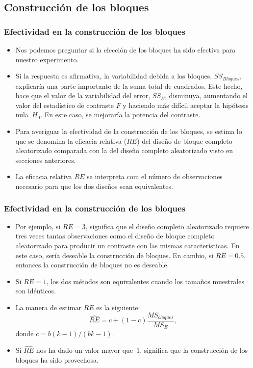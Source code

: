 \subsection{Construcción de los bloques}
\begin{frame}
\frametitle{Efectividad en la construcción de los bloques}
\begin{itemize}
\item<2-> Nos podemos preguntar si la elección de los bloques ha sido efectiva para nuestro experimento.
\item<3-> Si la respuesta es afirmativa, la variabilidad debida a los bloques, $SS_{Bloques}$, explicaría una parte importante de la suma total de cuadrados. Este hecho, hace que el valor de la variabilidad del error, $SS_E$, disminuya, aumentando el valor del estadístico de contraste $F$ y haciendo más difícil aceptar la hipótesis nula~$H_0$. En este caso, se mejoraría la potencia del contraste.
\item<4-> Para averiguar la efectividad de la construcción de los bloques, se estima lo que se denomina la eficacia relativa ($RE$) del diseño de bloque completo aleatorizado comparada con la del diseño completo aleatorizado visto en secciones anteriores.
\item<5-> La eficacia relativa $RE$ se interpreta com el número de observaciones necesario para que los dos diseños sean equivalentes.
\end{itemize}
\end{frame}
\begin{frame}
\frametitle{Efectividad en la construcción de los bloques}
\begin{itemize}
\item<2-> Por ejemplo, si $RE=3$, significa que el diseño completo aleatorizado requiere tres veces tantas observaciones como el diseño de bloque completo aleatorizado para producir un contraste con las mismas características. En este caso, sería deseable la construcción de bloques. En cambio, si $RE=0.5$, entonces la construcción de bloques no es deseable.
\item<3-> Si $RE=1$, los dos métodos son equivalentes cuando los tamaños muestrales son idénticos.
\item<4-> La manera de estimar $RE$ es la siguiente:
\[
\hat{RE}=c+(1-c)\frac{MS_{bloques}}{MS_E},
\]
donde $c=b(k-1)/(bk-1)$.
\item<5-> Si $\hat{RE}$ nos ha dado un valor mayor que~$1$, significa que la construcción de los bloques ha sido provechosa.
\end{itemize}
\end{frame}
